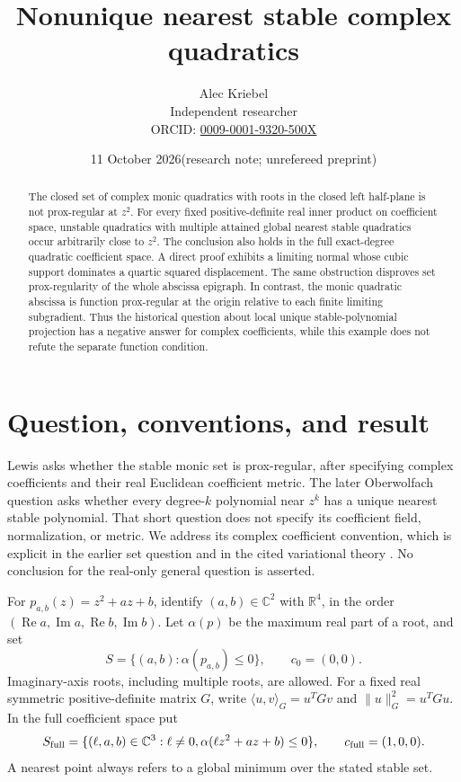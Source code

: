 \documentclass[11pt]{article}
\title{Nonunique nearest stable complex quadratics}
\author{Alec Kriebel\\\small Independent researcher\\
\small ORCID: \href{https://orcid.org/0009-0001-9320-500X}{0009-0001-9320-500X}}
\date{11 October 2026\quad\textnormal{(research note; unrefereed preprint)}}
\theoremstyle{remark}\newtheorem{remark}[theorem]{Remark}
\newcommand{\R}{\mathbb R}\newcommand{\C}{\mathbb C}
\newcommand{\ip}[2]{\langle #1,#2\rangle}
\newcommand{\norm}[1]{\lVert #1\rVert}
\newcommand{\Rea}{\operatorname{Re}}
\newcommand{\Ima}{\operatorname{Im}}
\begin{document}
\maketitle
\begin{abstract}
The closed set of complex monic quadratics with roots in the closed left half-plane
is not prox-regular at $z^2$. For every fixed positive-definite real inner product
on coefficient space, unstable quadratics with multiple attained global nearest
stable quadratics occur arbitrarily close to $z^2$. The conclusion also holds in
the full exact-degree quadratic coefficient space. A direct proof exhibits a
limiting normal whose cubic support dominates a quartic squared displacement.
The same obstruction disproves set prox-regularity of the whole abscissa epigraph.
In contrast, the monic quadratic abscissa is function prox-regular at the origin
relative to each finite limiting subgradient. Thus the historical question about
local unique stable-polynomial projection has a negative answer for complex
coefficients, while this example does not refute the separate function condition.
\end{abstract}

\section{Question, conventions, and result}
Lewis \cite[\S8, pp.~166--168]{Lewis2003} asks whether the stable monic set is
prox-regular, after specifying complex coefficients and their real Euclidean
coefficient metric. The later Oberwolfach question \cite[p.~106, Question~1]{OWR}
asks whether every degree-$k$ polynomial near $z^k$ has a unique nearest stable
polynomial. That short question does not specify its coefficient field,
normalization, or metric. We address its complex coefficient convention, which
is explicit in the earlier set question and in the cited variational theory
\cite{BO,BLO}. No conclusion for the real-only general question is asserted.

For $p_{a,b}(z)=z^2+az+b$, identify $(a,b)\in\C^2$ with $\R^4$, in the order
$(\Rea a,\Ima a,\Rea b,\Ima b)$. Let $\alpha(p)$ be the maximum real part of
a root, and set
\[
 S=\{(a,b):\alpha(p_{a,b})\leq0\},\qquad c_0=(0,0).
\]
Imaginary-axis roots, including multiple roots, are allowed. For a fixed real
symmetric positive-definite matrix $G$, write
$\ip{u}{v}_G=u^TGv$ and $\norm{u}_G^2=u^TGu$.
In the full coefficient space put
\[
 S_{\rm full}=\{(\ell,a,b)\in\C^3:\ell\ne0,
                 \alpha(\ell z^2+az+b)\leq0\},
 \qquad c_{\rm full}=(1,0,0).
\]
A nearest point always refers to a global minimum over the stated stable set.
\end{document}
